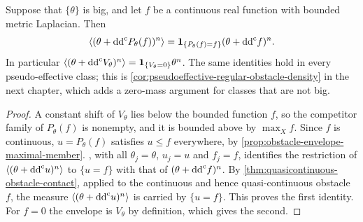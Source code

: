 \begin{corollary}\label{cor:big-regular-obstacle-density}
Suppose that $\{\theta\}$ is big, and let $f$ be a continuous real function with bounded metric Laplacian. Then
\[
 \langle(\theta+\mathrm{dd}^{\mathrm{c}} P_\theta(f))^n\rangle
   =\mathbf1_{\{P_\theta(f)=f\}}(\theta+\mathrm{dd}^{\mathrm{c}} f)^n.
\]
In particular $\langle(\theta+\mathrm{dd}^{\mathrm{c}} V_\theta)^n\rangle=\mathbf1_{\{V_\theta=0\}}\theta^n$. The same identities hold in every pseudo-effective class; this is \cref{cor:pseudoeffective-regular-obstacle-density} in the next chapter, which adds a zero-mass argument for classes that are not big.
\end{corollary}
\begin{proof}
A constant shift of $V_\theta$ lies below the bounded function $f$, so the competitor family of $P_\theta(f)$ is nonempty, and it is bounded above by $\max_Xf$. Since $f$ is continuous, $u=P_\theta(f)$ satisfies $u\leq f$ everywhere, by \cref{prop:obstacle-envelope-maximal-member}. , with all $\theta_j=\theta$, $u_j=u$ and $f_j=f$, identifies the restriction of $\langle(\theta+\mathrm{dd}^{\mathrm{c}} u)^n\rangle$ to $\{u=f\}$ with that of $(\theta+\mathrm{dd}^{\mathrm{c}} f)^n$. By \cref{thm:quasicontinuous-obstacle-contact}, applied to the continuous and hence quasi-continuous obstacle $f$, the measure $\langle(\theta+\mathrm{dd}^{\mathrm{c}} u)^n\rangle$ is carried by $\{u=f\}$. This proves the first identity. For $f=0$ the envelope is $V_\theta$ by definition, which gives the second.
\end{proof}
